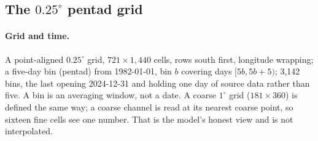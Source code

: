\documentclass[10pt]{article}
\begin{document}
\subsection{The $0.25^\circ$ pentad grid}\label{sec:data-tensor}

\paragraph{Grid and time.} A point-aligned $0.25^\circ$ grid, $721\times
1{,}440$ cells, rows south first, longitude wrapping; a five-day bin (pentad)
from 1982-01-01, bin $b$ covering days $[5b,5b+5)$; 3{,}142 bins, the last
opening 2024-12-31 and holding one day of source data rather than five.
A bin is an averaging window, not a date. A coarse $1^\circ$ grid
($181\times360$) is defined the same way; a coarse channel is read at its
nearest coarse point, so sixteen fine cells see one number. That is the
model's honest view and is not interpolated.
\end{document}

